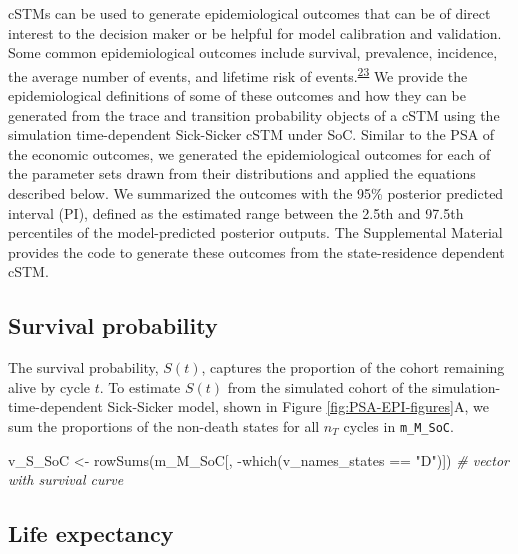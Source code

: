 \documentclass[
]{article}
\newenvironment{Shaded}{\begin{snugshade}}{\end{snugshade}}
\newcommand{\CommentTok}[1]{\textcolor[rgb]{0.56,0.35,0.01}{\textit{#1}}}
\newcommand{\FunctionTok}[1]{\textcolor[rgb]{0.00,0.00,0.00}{#1}}
\newcommand{\NormalTok}[1]{#1}
\newcommand{\OtherTok}[1]{\textcolor[rgb]{0.56,0.35,0.01}{#1}}
\newcommand{\SpecialCharTok}[1]{\textcolor[rgb]{0.00,0.00,0.00}{#1}}
\newcommand{\StringTok}[1]{\textcolor[rgb]{0.31,0.60,0.02}{#1}}
\begin{document}
cSTMs can be used to generate epidemiological outcomes that can be of direct interest to the decision maker or be helpful for model calibration and validation. Some common epidemiological outcomes include survival, prevalence, incidence, the average number of events, and lifetime risk of events.\textsuperscript{\protect\hyperlink{ref-Siebert2012c}{23}} We provide the epidemiological definitions of some of these outcomes and how they can be generated from the trace and transition probability objects of a cSTM using the simulation time-dependent Sick-Sicker cSTM under SoC. Similar to the PSA of the economic outcomes, we generated the epidemiological outcomes for each of the parameter sets drawn from their distributions and applied the equations described below. We summarized the outcomes with the 95\% posterior predicted interval (PI), defined as the estimated range between the 2.5th and 97.5th percentiles of the model-predicted posterior outputs. The Supplemental Material provides the code to generate these outcomes from the state-residence dependent cSTM.

\hypertarget{survival-probability}{%
\subsection{Survival probability}\label{survival-probability}}

The survival probability, \(S(t)\), captures the proportion of the cohort remaining alive by cycle \(t\). To estimate \(S(t)\) from the simulated cohort of the simulation-time-dependent Sick-Sicker model, shown in Figure \ref{fig:PSA-EPI-figures}A, we sum the proportions of the non-death states for all \(n_T\) cycles in \texttt{m\_M\_SoC}.

\begin{Shaded}
\begin{Highlighting}[]
\NormalTok{v\_S\_SoC }\OtherTok{\textless{}{-}} \FunctionTok{rowSums}\NormalTok{(m\_M\_SoC[, }\SpecialCharTok{{-}}\FunctionTok{which}\NormalTok{(v\_names\_states }\SpecialCharTok{==} \StringTok{"D"}\NormalTok{)]) }\CommentTok{\# vector with survival curve}
\end{Highlighting}
\end{Shaded}

\hypertarget{life-expectancy}{%
\subsection{Life expectancy}\label{life-expectancy}}
\end{document}
